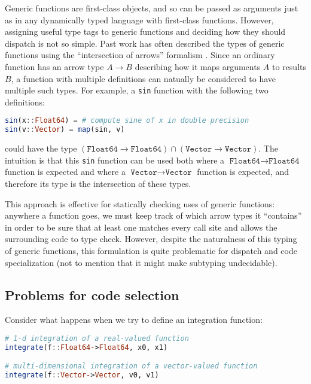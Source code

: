 Generic functions are first-class objects, and so can be passed as arguments
just as in any dynamically typed language with first-class functions.
However, assigning useful type tags to generic functions and deciding how
they should dispatch is not so simple.
Past work has often described the types of generic functions using the
``intersection of arrows'' formalism
\cite{RonchiDellaRocca:1988:PTS:55079.55086, Dunfield:2012:EIU:2364527.2364534,
boundedquant, Castagna:1995:COF:203496.203510}.
Since an ordinary function has an arrow type $A\rightarrow B$ describing how it
maps arguments $A$ to results $B$, a function with multiple definitions can
natually be considered to have multiple such types.
For example, a \texttt{sin} function with the following two definitions:

\begin{singlespace}
\begin{lstlisting}[language=julia]
sin(x::Float64) = # compute sine of x in double precision
sin(v::Vector) = map(sin, v)
\end{lstlisting}
\end{singlespace}

\noindent
could have the type $(\texttt{Float64}\rightarrow\texttt{Float64})\cap(\texttt{Vector}\rightarrow\texttt{Vector})$.
The intuition is that this \texttt{sin} function can be
used both where a $\texttt{Float64}\rightarrow\texttt{Float64}$ function
is expected and where a $\texttt{Vector}\rightarrow\texttt{Vector}$ function is expected,
and therefore its type is the intersection of these types.

This approach is effective for statically checking uses of generic
functions: anywhere a function goes, we must keep track of which arrow
types it ``contains'' in order to be sure that at least one matches
every call site and allows the surrounding code to type check.
However, despite the naturalness of this typing of generic functions,
this formulation is quite problematic for dispatch and code specialization
(not to mention that it might make subtyping undecidable).

\subsection{Problems for code selection}

Consider what happens when we try to define an integration function:

\begin{singlespace}
\begin{lstlisting}[language=julia]
# 1-d integration of a real-valued function
integrate(f::Float64->Float64, x0, x1)

# multi-dimensional integration of a vector-valued function
integrate(f::Vector->Vector, v0, v1)
\end{lstlisting}
\end{singlespace}

